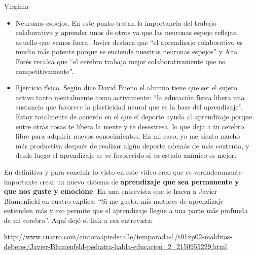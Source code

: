\begin{opin}{\virgicolor}{Virginia}
\begin{itemize}
\item Neuronas espejos. En este punto tratan la importancia del trabajo colaborativo y aprender unos de otros ya que las neuronas espejo reflejan aquello que vemos fuera. Javier destaca que “el aprendizaje colaborativo es mucho más potente porque se enciende nuestras neuronas espejos” y Ana Forés recalca que “el cerebro trabaja mejor colaborativamente que no competitivamente”. 

 
\item Ejercicio físico. Según dice David Bueno el alumno tiene que ser el sujeto activo tanto mentalmente como activamente: “la educación física libera una sustancia que favorece la plasticidad neural que es la base del aprendizaje”. Estoy totalmente de acuerdo en el que el deporte ayuda al aprendizaje porque entre otras cosas te libera la mente y te desestresa, lo que deja a tu cerebro libre para adquirir nuevos conocimientos. En mi caso, yo me siento mucho más productiva después de realizar algún deporte además de más contenta, y desde luego el aprendizaje se ve favorecido si tu estado anímico es mejor. 

\end{itemize}


En definitiva y para concluir lo visto en este vídeo creo que es verdaderamente importante crear un nuevo sistema de \textbf{aprendizaje que sea permanente y que nos guste y emocione}. En una entrevista que le hacen a Javier Blumenfield en cuatro explica: “Si me gusta, mis motores de aprendizaje entienden más y eso permite que el aprendizaje llegue a una parte más profunda de mi cerebro”. Aquí dejó el link a esa entrevista:

\url{http://www.cuatro.com/cintoraapiedecalle/temporada-1/t01xp02-malditos-deberes/Javier-Blumenfeld-pediatra-habla-educacion_2_2150955229.html}



\end{opin}
